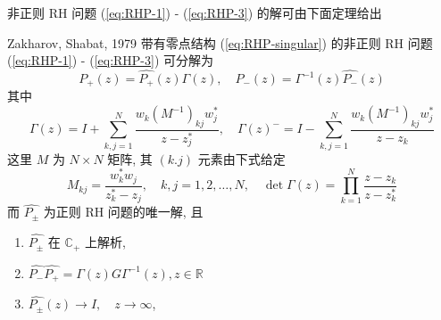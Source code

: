 非正则 RH 问题 (\ref{eq:RHP-1}) - (\ref{eq:RHP-3}) 的解可由下面定理给出
\begin{theorem}{Zakharov, Shabat, 1979}
  带有零点结构 (\ref{eq:RHP-singular}) 的非正则 RH 问题 (\ref{eq:RHP-1}) - (\ref{eq:RHP-3}) 可分解为
  \begin{equation}
    P_{+}(z) = \hat{P_{+}}(z) \Gamma(z) , \quad P_{-}(z) = \Gamma^{-1}(z) \hat{P_{-}}(z) \label{eq:RHP-decomposition}
  \end{equation}
  其中 
  \begin{equation}
    \Gamma(z) = I + \sum_{k,j = 1}^{N} \frac{w_{k}(M^{-1})_{kj} w_{j}^{*}}{z - z_{j}^{*}}, \quad \Gamma(z)^{-} = I - \sum_{k,j = 1}^{N} \frac{w_{k}(M^{-1})_{kj} w_{j}^{*}}{z - z_{k}} \label{eq:Gamma}
  \end{equation}
  这里 $ M $ 为 $ N \times N $ 矩阵, 其 $ (k.j) $ 元素由下式给定 
  \begin{equation}
    M_{kj} = \frac{w_{k}^{*}w_{j}}{z_{k}^{*} - z_{j}}, \quad k,j = 1,2, \dots, N, \quad \det \Gamma(z) = \prod_{k=1}^{N} \frac{z - z_{k}}{z - z_{k}^{*}}
  \end{equation}
  而 $ \hat{P_{\pm}} $ 为正则 RH 问题的唯一解, 且 
  \begin{enumerate}
    \item $ \hat{P_{\pm}} $ 在 $ \mathbb{C_{+}} $ 上解析,
    \item $ \hat{P_{-}} \hat{P_{+}} = \Gamma(z) G \Gamma^{-1}(z), z \in \mathbb{R} $
    \item $ \hat{P_{\pm}}(z) \to I, \quad z \to \infty $,
  \end{enumerate}
\end{theorem}
